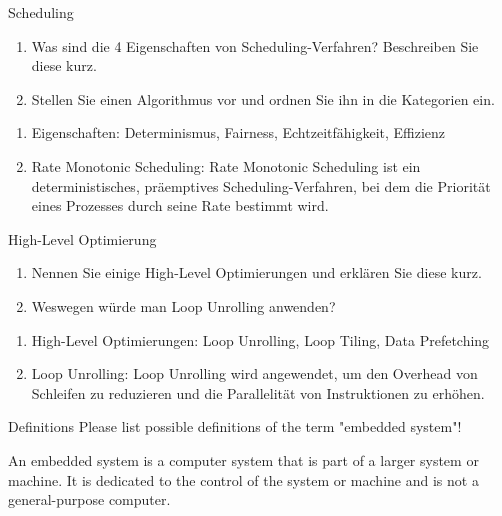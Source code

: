 \documentclass{article}
\begin{document}
\begin{exercise}{Scheduling}
  \begin{enumerate}
    \item Was sind die 4 Eigenschaften von Scheduling-Verfahren? Beschreiben Sie diese kurz.
    \item Stellen Sie einen Algorithmus vor und ordnen Sie ihn in die Kategorien ein.
  \end{enumerate}

  \begin{solution}
    \begin{enumerate}
      \item Eigenschaften: Determinismus, Fairness, Echtzeitfähigkeit, Effizienz
      \item Rate Monotonic Scheduling: Rate Monotonic Scheduling ist ein deterministisches, präemptives Scheduling-Verfahren, bei dem die Priorität eines Prozesses durch seine Rate bestimmt wird.
    \end{enumerate}
  \end{solution}
\end{exercise}

\begin{exercise}{High-Level Optimierung}
  \begin{enumerate}
    \item Nennen Sie einige High-Level Optimierungen und erklären Sie diese kurz.
    \item Weswegen würde man Loop Unrolling anwenden?
  \end{enumerate}

  \begin{solution}
    \begin{enumerate}
      \item High-Level Optimierungen: Loop Unrolling, Loop Tiling, Data Prefetching
      \item Loop Unrolling: Loop Unrolling wird angewendet, um den Overhead von Schleifen zu reduzieren und die Parallelität von Instruktionen zu erhöhen.
    \end{enumerate}
  \end{solution}
\end{exercise}

\begin{exercise}{Definitions}
  Please list possible definitions of the term "embedded system"!

  \begin{solution}
    An embedded system is a computer system that is part of a larger system or machine. It is dedicated to the control of the system or machine and is not a general-purpose computer.
  \end{solution}
\end{exercise}
\end{document}
